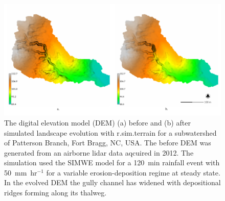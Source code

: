 \documentclass[gmd, manuscript]{copernicus}
\begin{document}


\begin{figure}%
\center
\includegraphics[width=\textwidth,height=0.925\textheight,keepaspectratio]{figures/evolution.pdf}
\caption{
The digital elevation model (DEM) 
(a) before and (b) after
simulated landscape evolution with r.sim.terrain 
for a subwatershed of Patterson Branch, Fort Bragg, NC, USA. 
The before DEM was generated from an airborne lidar data aqcuired in 2012. 
The simulation used the SIMWE model
for a 120~\unit{min} rainfall event with 50~\unit{mm~hr}$^{-1}$
for a variable erosion-deposition regime at steady state.
In the evolved DEM 
the gully channel has widened 
with depositional ridges forming along its thalweg.}
\label{fig:evolution}
\end{figure}

\end{document}

